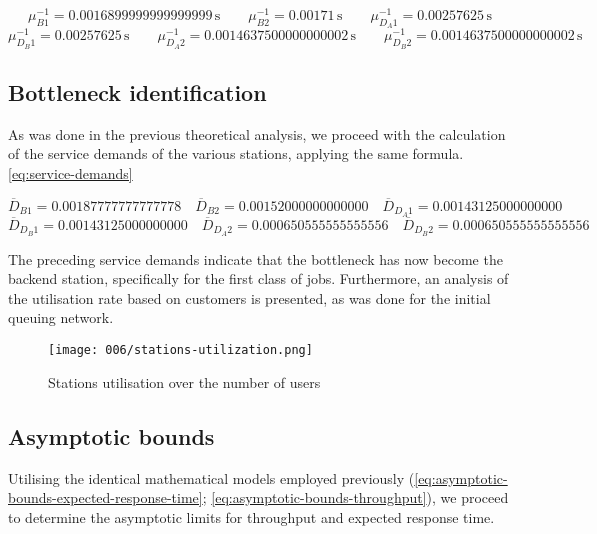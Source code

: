 \[
\mu^{-1}_{B1} = \num[round-mode=places, round-precision=5]{0.0016899999999999999} \, \text{s}
\quad \quad
\mu^{-1}_{B2} = \num[round-mode=places, round-precision=5]{0.00171} \, \text{s}
\quad \quad
\mu^{-1}_{D_{A}1} = \num[round-mode=places, round-precision=5]{0.00257625} \, \text{s}
\]
\[
\mu^{-1}_{D_{B}1} = \num[round-mode=places, round-precision=5]{0.00257625} \, \text{s}
\quad \quad
\mu^{-1}_{D_{A}2} = \num[round-mode=places, round-precision=5]{0.0014637500000000002} \, \text{s}
\quad \quad
\mu^{-1}_{D_{B}2} = \num[round-mode=places, round-precision=5]{0.0014637500000000002} \, \text{s}
\]

\subsection{Bottleneck identification}

As was done in the previous theoretical analysis, we proceed with the calculation of the service demands of the various stations, applying the same formula. \ref{eq:service-demands}

\[
\overline{D}_{B1} = \num[round-mode=places, round-precision=5]{0.00187777777777778}
\quad
\overline{D}_{B2} = \num[round-mode=places, round-precision=5]{0.00152000000000000}
\quad
\overline{D}_{D_{A}1} = \num[round-mode=places, round-precision=5]{0.00143125000000000}
\]
\[
\overline{D}_{D_{B}1} = \num[round-mode=places, round-precision=5]{0.00143125000000000}
\quad
\overline{D}_{D_{A}2}  = \num[round-mode=places, round-precision=5]{0.000650555555555556}
\quad
\overline{D}_{D_{B}2} = \num[round-mode=places, round-precision=5]{0.000650555555555556}
\]

The preceding service demands indicate that the bottleneck has now become the backend station, specifically for the first class of jobs.
Furthermore, an analysis of the utilisation rate based on customers is presented, as was done for the initial queuing network.

\begin{figure}[h]
	\centering
	\texttt{[image: 006/stations-utilization.png]}
	\caption{Stations utilisation over the number of users}
\end{figure}

\subsection{Asymptotic bounds}

Utilising the identical mathematical models employed previously (\ref{eq:asymptotic-bounds-expected-response-time}; \ref{eq:asymptotic-bounds-throughput}), we proceed to determine the asymptotic limits for throughput and expected response time.


